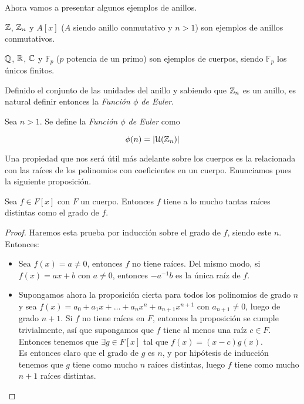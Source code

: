Ahora vamos a presentar algunos ejemplos de anillos.

\begin{ejemplo}
	$\mathbb{Z}$, $\mathbb{Z}_n$ y $A[x]$ ($A$ siendo anillo conmutativo y $n > 1$) son ejemplos de anillos conmutativos.
\end{ejemplo}

\begin{ejemplo}
	$\mathbb{Q}$, $\mathbb{R}$, $\mathbb{C}$ y $\mathbb{F}_p$ ($p$ potencia de un primo) son ejemplos de cuerpos, siendo $\mathbb{F}_p$ los únicos finitos. 
\end{ejemplo}

Definido el conjunto de las unidades del anillo y sabiendo que $\mathbb{Z}_n$ es un anillo, es natural definir entonces la \textit{Función $\phi$ de Euler}.

\begin{definicion}\label{funcion_phi_de_euler}
	Sea $n > 1$. Se define la \textit{Función $\phi$ de Euler} como
	
	\begin{equation}
	\phi(n) = |\mathcal{U}(\mathbb{Z}_n)|
	\end{equation}
\end{definicion}

Una propiedad que nos será útil más adelante sobre los cuerpos es la relacionada con las raíces de los polinomios con coeficientes en un cuerpo. Enunciamos pues la siguiente proposición.

\begin{proposicion}\label{raices_en_cuerpos}
	Sea $f \in F[x]$ con $F$ un cuerpo. Entonces $f$ tiene a lo mucho tantas raíces distintas como el grado de $f$.
\end{proposicion}

\begin{proof}
	Haremos esta prueba por inducción  sobre el grado de $f$, siendo este $n$. Entonces:
	
	\begin{itemize}
		\item Sea $f(x) = a \neq 0$, entonces $f$ no tiene raíces. Del mismo modo, si $f(x) = ax + b$ con $a \neq 0$, entonces $-a^{-1}b$ es la única raíz de $f$.
		
		\item Supongamos ahora la proposición cierta para todos los polinomios de grado $n$ y sea $f(x) = a_0 + a_1x + \dotso + a_nx^n + a_{n+1}x^{n+1}$ con $a_{n+1} \neq 0$, luego de grado $n+1$. Si $f$ no tiene raíces en $F$, entonces la proposición se cumple trivialmente, así que supongamos que $f$ tiene al menos una raíz $c \in F$. Entonces tenemos que $\exists g \in F[x]$ tal que $f(x) = (x - c)g(x)$.\\
		
		Es entonces claro que el grado de $g$ es $n$, y por hipótesis de inducción tenemos que $g$ tiene como mucho $n$ raíces distintas, luego $f$ tiene como mucho $n+1$ raíces distintas.
	\end{itemize}
\end{proof}

